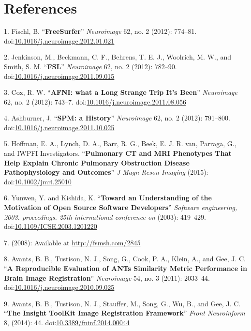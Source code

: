 \documentclass[11pt,]{article}
\begin{document}
\clearpage

\newpage

\section*{References}\label{references}

1. Fischl, B. ``\textbf{FreeSurfer}'' \emph{Neuroimage} 62, no. 2
(2012): 774--81.
doi:\href{http://dx.doi.org/10.1016/j.neuroimage.2012.01.021}{10.1016/j.neuroimage.2012.01.021}

2. Jenkinson, M., Beckmann, C. F., Behrens, T. E. J., Woolrich, M. W.,
and Smith, S. M. ``\textbf{FSL}'' \emph{Neuroimage} 62, no. 2 (2012):
782--90.
doi:\href{http://dx.doi.org/10.1016/j.neuroimage.2011.09.015}{10.1016/j.neuroimage.2011.09.015}

3. Cox, R. W. ``\textbf{AFNI: what a Long Strange Trip It's Been}''
\emph{Neuroimage} 62, no. 2 (2012): 743--7.
doi:\href{http://dx.doi.org/10.1016/j.neuroimage.2011.08.056}{10.1016/j.neuroimage.2011.08.056}

4. Ashburner, J. ``\textbf{SPM: a History}'' \emph{Neuroimage} 62, no. 2
(2012): 791--800.
doi:\href{http://dx.doi.org/10.1016/j.neuroimage.2011.10.025}{10.1016/j.neuroimage.2011.10.025}

5. Hoffman, E. A., Lynch, D. A., Barr, R. G., Beek, E. J. R. van,
Parraga, G., and IWPFI Investigators. ``\textbf{Pulmonary CT and MRI
Phenotypes That Help Explain Chronic Pulmonary Obstruction Disease
Pathophysiology and Outcomes}'' \emph{J Magn Reson Imaging} (2015):
doi:\href{http://dx.doi.org/10.1002/jmri.25010}{10.1002/jmri.25010}

6. Yunwen, Y. and Kishida, K. ``\textbf{Toward an Understanding of the
Motivation of Open Source Software Developers}'' \emph{Software
engineering, 2003. proceedings. 25th international conference on}
(2003): 419--429.
doi:\href{http://dx.doi.org/10.1109/ICSE.2003.1201220}{10.1109/ICSE.2003.1201220}

7. (2008): Available at \url{http://fsmsh.com/2845}

8. Avants, B. B., Tustison, N. J., Song, G., Cook, P. A., Klein, A., and
Gee, J. C. ``\textbf{A Reproducible Evaluation of ANTs Similarity Metric
Performance in Brain Image Registration}'' \emph{Neuroimage} 54, no. 3
(2011): 2033--44.
doi:\href{http://dx.doi.org/10.1016/j.neuroimage.2010.09.025}{10.1016/j.neuroimage.2010.09.025}

9. Avants, B. B., Tustison, N. J., Stauffer, M., Song, G., Wu, B., and
Gee, J. C. ``\textbf{The Insight ToolKit Image Registration Framework}''
\emph{Front Neuroinform} 8, (2014): 44.
doi:\href{http://dx.doi.org/10.3389/fninf.2014.00044}{10.3389/fninf.2014.00044}
\end{document}
